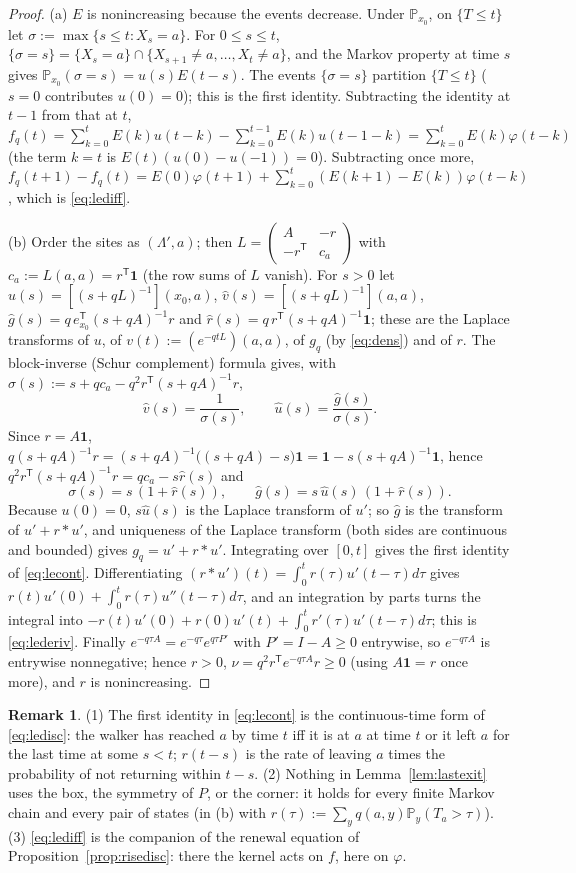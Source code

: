 \documentclass[11pt,a4paper]{article}
\theoremstyle{definition}
\newtheorem*{remarku}{Remark}
\newcommand{\one}{\mathbf 1}
\newcommand{\Prob}{\mathbb P}
\newcommand{\T}{^{\mathsf T}}
\begin{document}
\begin{proof}
(a) $E$ is nonincreasing because the events decrease. Under $\Prob_{x_0}$, on $\{T\le t\}$ let $\sigma:=\max\{s\le t:X_s=a\}$. For $0\le s\le t$, $\{\sigma=s\}=\{X_s=a\}\cap\{X_{s+1}\ne a,\dots,X_t\ne a\}$, and the Markov property at time $s$ gives $\Prob_{x_0}(\sigma=s)=u(s)E(t-s)$. The events $\{\sigma=s\}$ partition $\{T\le t\}$ ($s=0$ contributes $u(0)=0$); this is the first identity. Subtracting the identity at $t-1$ from that at $t$,
$f_q(t)=\sum_{k=0}^tE(k)u(t-k)-\sum_{k=0}^{t-1}E(k)u(t-1-k)=\sum_{k=0}^tE(k)\varphi(t-k)$
(the term $k=t$ is $E(t)(u(0)-u(-1))=0$). Subtracting once more, $f_q(t+1)-f_q(t)=E(0)\varphi(t+1)+\sum_{k=0}^t(E(k+1)-E(k))\varphi(t-k)$, which is \eqref{eq:lediff}.

(b) Order the sites as $(\Lambda',a)$; then $L=\begin{pmatrix}A&-r\\-r\T&c_a\end{pmatrix}$ with $c_a:=L(a,a)=r\T\one$ (the row sums of $L$ vanish). For $s>0$ let $\hat u(s)=[(s+qL)^{-1}](x_0,a)$, $\hat v(s)=[(s+qL)^{-1}](a,a)$, $\hat g(s)=q\,e_{x_0}\T(s+qA)^{-1}r$ and $\hat r(s)=q\,r\T(s+qA)^{-1}\one$; these are the Laplace transforms of $u$, of $v(t):=(e^{-qtL})(a,a)$, of $g_q$ (by \eqref{eq:dens}) and of $r$. The block-inverse (Schur complement) formula gives, with $\sigma(s):=s+qc_a-q^2r\T(s+qA)^{-1}r$,
\[
\hat v(s)=\frac1{\sigma(s)},\qquad \hat u(s)=\frac{\hat g(s)}{\sigma(s)} .
\]
Since $r=A\one$, $q(s+qA)^{-1}r=(s+qA)^{-1}\bigl((s+qA)-s\bigr)\one=\one-s(s+qA)^{-1}\one$, hence $q^2r\T(s+qA)^{-1}r=qc_a-s\hat r(s)$ and
\[
\sigma(s)=s\,(1+\hat r(s)),\qquad \hat g(s)=s\,\hat u(s)\,(1+\hat r(s)).
\]
Because $u(0)=0$, $s\hat u(s)$ is the Laplace transform of $u'$; so $\hat g$ is the transform of $u'+r*u'$, and uniqueness of the Laplace transform (both sides are continuous and bounded) gives $g_q=u'+r*u'$. Integrating over $[0,t]$ gives the first identity of \eqref{eq:lecont}. Differentiating $(r*u')(t)=\int_0^tr(\tau)u'(t-\tau)d\tau$ gives $r(t)u'(0)+\int_0^tr(\tau)u''(t-\tau)d\tau$, and an integration by parts turns the integral into $-r(t)u'(0)+r(0)u'(t)+\int_0^tr'(\tau)u'(t-\tau)d\tau$; this is \eqref{eq:lederiv}. Finally $e^{-q\tau A}=e^{-q\tau}e^{q\tau P'}$ with $P'=I-A\ge0$ entrywise, so $e^{-q\tau A}$ is entrywise nonnegative; hence $r>0$, $\nu=q^2r\T e^{-q\tau A}r\ge0$ (using $A\one=r$ once more), and $r$ is nonincreasing.
\end{proof}

\begin{remarku}
(1) The first identity in \eqref{eq:lecont} is the continuous-time form of \eqref{eq:ledisc}: the walker has reached $a$ by time $t$ iff it is at $a$ at time $t$ or it left $a$ for the last time at some $s<t$; $r(t-s)$ is the rate of leaving $a$ times the probability of not returning within $t-s$. (2) Nothing in Lemma~\ref{lem:lastexit} uses the box, the symmetry of $P$, or the corner: it holds for every finite Markov chain and every pair of states (in (b) with $r(\tau):=\sum_yq(a,y)\Prob_y(T_a>\tau)$). (3) \eqref{eq:lediff} is the companion of the renewal equation of Proposition~\ref{prop:risedisc}: there the kernel acts on $f$, here on $\varphi$.
\end{remarku}
\end{document}
